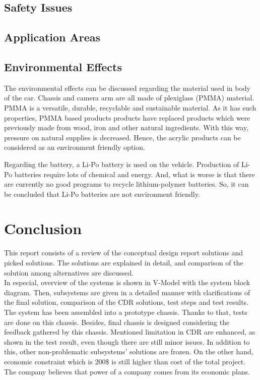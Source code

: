 \documentclass[a4paper,12pt]{article}
\begin{document}
\subsection{Safety Issues}
\subsection{Application Areas}
\subsection{Environmental Effects}
The environmental effects can be discussed regarding the material used in body of the car. Chassis and camera arm are all made of plexiglass (PMMA) material. PMMA is a versatile, durable, recyclable and sustainable material. As it has such properties, PMMA based products products have replaced products which were previously made from wood, iron and other natural ingredients. With this way, pressure on natural supplies is decreased. Hence, the acrylic products can be considered as an environment friendly option.

Regarding the battery, a Li-Po battery is used on the vehicle. Production of Li-Po batteries require lots of chemical and energy. And, what is worse is that there are currently no good programs to recycle lithium-polymer batteries. So, it can be concluded that Li-Po batteries are not environment friendly.

\section{Conclusion}

This report consists of a review of the conceptual design report solutions and picked solutions. The solutions are explained in detail, and comparison of the solution among alternatives are discussed. \\

In especial, overview of the systems is shown in V-Model with the system block diagram. Then, subsystems are given in a detailed manner with clarifications of the final solution, comparison of the CDR solutions, test steps and test results. The system has been assembled into a prototype chassis. Thanks to that, tests are done on this chassis. Besides, final chassis is designed considering the feedback gathered by this chassis. Mentioned limitation in CDR are enhanced, as shown in the test result, even though there are still minor issues. In addition to this, other non-problematic subsystems’ solutions are frozen. On the other hand, economic constraint which is 200\$ is still higher than cost of the total project. The company believes that power of a company comes from its economic plans. \\
\end{document}
